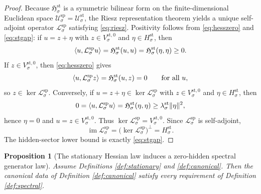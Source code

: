 \documentclass[11pt]{article}
\newcommand{\SpecSpace}[1]{\mathcal U_{#1}^{\mathrm{sp}}}
\newcommand{\SpecOp}[1]{\mathcal L_{#1}^{\mathrm{sp}}}
\newcommand{\StatSpace}[1]{\mathcal U_{#1}^{\mathrm{st}}}
\newcommand{\StatZero}[1]{V_{#1}^{\mathrm{st},0}}
\newcommand{\StatHidden}[1]{H_{#1}^{\mathrm{st}}}
\newcommand{\StatHess}[1]{\mathfrak H_{#1}^{\mathrm{st}}}
\newtheorem{proposition}{Proposition}
\begin{document}
\begin{proof}
Because \(\StatHess{\sigma}\) is a symmetric bilinear form on the finite-dimensional Euclidean space \(\SpecSpace{\sigma}=\StatSpace{\sigma}\), the Riesz representation theorem yields a unique self-adjoint operator \(\SpecOp{\sigma}\) satisfying \eqref{eq:riesz}. Positivity follows from \eqref{eq:hesszero} and \eqref{eq:stgap}: if \(u=z+\eta\) with \(z\in\StatZero{\sigma}\) and \(\eta\in\StatHidden{\sigma}\), then
\[
\ev{u,\SpecOp{\sigma}u}
=
\StatHess{\sigma}(u,u)
=
\StatHess{\sigma}(\eta,\eta)
\ge
0.
\]
If \(z\in\StatZero{\sigma}\), then \eqref{eq:hesszero} gives
\[
\ev{u,\SpecOp{\sigma}z}
=
\StatHess{\sigma}(u,z)=0
\qquad
\text{for all }u,
\]
so \(z\in\ker\SpecOp{\sigma}\). Conversely, if \(u=z+\eta\in\ker\SpecOp{\sigma}\) with \(z\in\StatZero{\sigma}\) and \(\eta\in\StatHidden{\sigma}\), then
\[
0
=
\ev{u,\SpecOp{\sigma}u}
=
\StatHess{\sigma}(\eta,\eta)
\ge
\lambda_{\sigma}^{\mathrm{st}}\|\eta\|^{2},
\]
hence \(\eta=0\) and \(u=z\in\StatZero{\sigma}\). Thus \(\ker\SpecOp{\sigma}=\StatZero{\sigma}\). Since \(\SpecOp{\sigma}\) is self-adjoint,
\[
\operatorname{im}\SpecOp{\sigma}
=
\bigl(\ker\SpecOp{\sigma}\bigr)^{\perp}
=
\StatHidden{\sigma}.
\]
The hidden-sector lower bound is exactly \eqref{eq:stgap}.
\end{proof}

\begin{proposition}[The stationary Hessian law induces a zero-hidden spectral generator law]
\label{prop:spectral}
Assume Definitions \ref{def:stationary} and \ref{def:canonical}. Then the canonical data of Definition \ref{def:canonical} satisfy every requirement of Definition \ref{def:spectral}.
\end{proposition}
\end{document}
